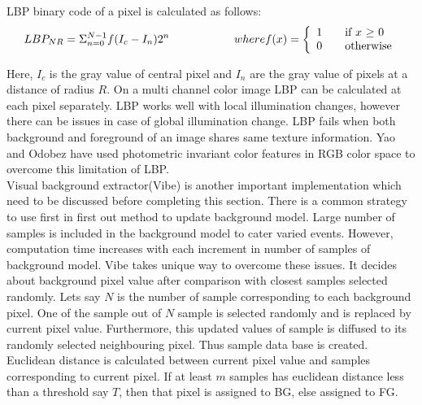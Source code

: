 LBP binary code of a pixel is calculated as follows:
\begin{equation}
LBP_{NR} = \Sigma _{n = 0} ^{N - 1} f(I_c - I_n) 2^n \hspace{20 mm} where f(x) = \left\{ 
  \begin{array}{l l}
     1 & \quad \text{if $x$ $\geq$  $0$}\\
     0 & \quad \text{otherwise}
   \end{array} \right.
\end{equation}

\indent Here, $I_c$ is the gray value of central pixel and $I_n$ are the gray
value of pixels at a distance of radius $R$.  On a multi channel color
image LBP can be calculated at each pixel separately. LBP works well with
local illumination changes, however there can be issues in case of
global illumination change. LBP fails when both background and foreground
of an image shares same texture information. Yao and Odobez have used
photometric invariant color features in RGB color space to overcome this
limitation of LBP.\\

\indent Visual background extractor(Vibe) \cite{9} is another important
implementation which need to be discussed before completing this
section. There is a common strategy to use first in first out method to
update background model. Large number of samples is included in the
background model to cater varied events. However, computation time
increases with each increment in number of samples of background model.
Vibe takes unique way to overcome these issues. It decides about
background pixel value after comparison with closest samples selected
randomly. Lets say $N$ is the number of sample corresponding to each
background pixel. One of the sample out of $N$ sample is selected
randomly and is replaced by current pixel value. Furthermore, this
updated values of sample is diffused to its randomly selected
neighbouring pixel. Thus sample data base is created. Euclidean distance
is calculated between current pixel value and samples corresponding to
current pixel. If at least $m$ samples has euclidean distance less than
a threshold say $T$, then that pixel is assigned to BG, else assigned to
FG.\\

